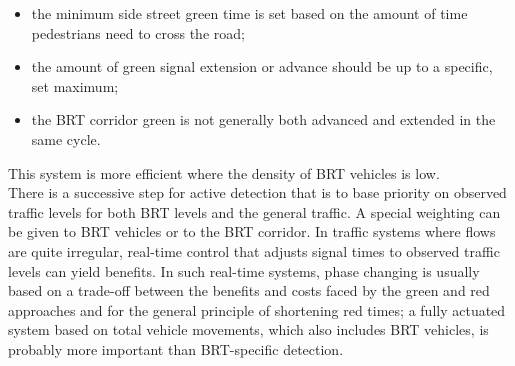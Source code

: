 \documentclass{article}
\begin{document}
\begin{itemize}
\item the minimum side street green time is set based on the amount of time pedestrians need to cross the road; 
\item the amount of green signal extension or advance should be up to a specific, set maximum; 
\item the BRT corridor green is not generally both advanced and extended in the same cycle. 
\end{itemize}
This system is more efficient where the density of BRT vehicles is low.\\
There is a successive step for active detection that is to base priority on observed traffic levels for both BRT levels and the general traffic. A special weighting can be given to BRT vehicles or to the BRT corridor. In traffic systems where flows are quite irregular, real-time control that adjusts signal times to observed traffic levels can yield benefits. In such real-time systems, phase changing is usually based on a trade-off between the benefits and costs faced by the green and red approaches and for the general principle of shortening red times; a fully actuated system based on total vehicle movements, which also includes BRT vehicles, is probably more important than BRT-specific detection. 
\end{document}

